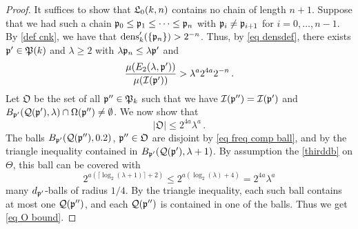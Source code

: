 {\begin{proof}
    It suffices to show that $\mathfrak L_0(k,n)$ contains no chain of length $n + 1$. Suppose that we had such a chain $\mathfrak p_0 \le \mathfrak p_1 \le \dotsb \le \mathfrak p_{n}$ with $\mathfrak p_i \ne \mathfrak p_{i+1}$ for $i  =0, \dotsc, n-1$. By \eqref{def cnk}, we have that $\operatorname{\operatorname{dens}}_k'(\{\mathfrak p_n\}) > 2^{-n}$. Thus, by \eqref{eq densdef}, there exists $\mathfrak p' \in \mathfrak P(k)$ and $\lambda \ge 2$ with $\lambda \mathfrak p_n \le \lambda \mathfrak p'$ and
    \begin{equation}
        \label{eq p'}
        \frac{\mu(E_2(\lambda, \mathfrak p'))}{\mu(\mathcal{I}(\mathfrak p'))} > \lambda^{a} 2^{4a} 2^{-n}\,.
    \end{equation}
    Let $\mathfrak{O}$ be the set of all $\mathfrak p'' \in \mathfrak P_k$ such that we have $ \mathcal{I}(\mathfrak p'') = \mathcal{I}(\mathfrak p')$ and $B_{\mathfrak p'}(\mathcal{Q}(\mathfrak p'), \lambda) \cap \Omega(\mathfrak p'') \neq \emptyset$.
    We now show that
    \begin{equation}
        \label{eq O bound}
        |\mathfrak{O}| \le 2^{4a}\lambda^a\,.
    \end{equation}
    The balls $B_{\mathfrak p'}(\mathcal{Q}(\mathfrak p''), 0.2)$, $\mathfrak p'' \in \mathfrak{O}$ are disjoint by \eqref{eq freq comp ball}, and by the triangle inequality contained in $B_{\mathfrak p'}(\mathcal{Q}(\mathfrak p'), \lambda+1)$. By assumption the \eqref{thirddb} on $\Theta$, this ball can be covered with
    $$
        2^{a(\lceil \log_2(\lambda+1)\rceil + 2)} \le 2^{a(\log_2(\lambda) + 4)} = 2^{4a}\lambda^a
    $$ many $d_{\mathfrak p'}$-balls of radius $1/4$. By the triangle inequality, each such ball contains at most one $\mathcal{Q}(\mathfrak p'')$, and each $\mathcal{Q}(\mathfrak p'')$ is contained in one of the balls. Thus we get \eqref{eq O bound}.


\end{proof}}
